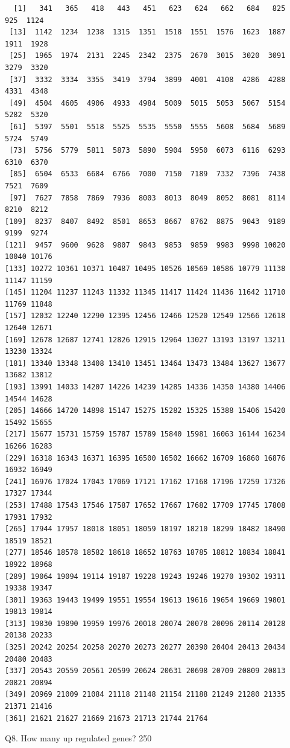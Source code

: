 \documentclass[
  letterpaper,
  DIV=11,
  numbers=noendperiod]{scrartcl}
\begin{document}
\begin{verbatim}
  [1]   341   365   418   443   451   623   624   662   684   825   925  1124
 [13]  1142  1234  1238  1315  1351  1518  1551  1576  1623  1887  1911  1928
 [25]  1965  1974  2131  2245  2342  2375  2670  3015  3020  3091  3279  3320
 [37]  3332  3334  3355  3419  3794  3899  4001  4108  4286  4288  4331  4348
 [49]  4504  4605  4906  4933  4984  5009  5015  5053  5067  5154  5282  5320
 [61]  5397  5501  5518  5525  5535  5550  5555  5608  5684  5689  5724  5749
 [73]  5756  5779  5811  5873  5890  5904  5950  6073  6116  6293  6310  6370
 [85]  6504  6533  6684  6766  7000  7150  7189  7332  7396  7438  7521  7609
 [97]  7627  7858  7869  7936  8003  8013  8049  8052  8081  8114  8210  8212
[109]  8237  8407  8492  8501  8653  8667  8762  8875  9043  9189  9199  9274
[121]  9457  9600  9628  9807  9843  9853  9859  9983  9998 10020 10040 10176
[133] 10272 10361 10371 10487 10495 10526 10569 10586 10779 11138 11147 11159
[145] 11204 11237 11243 11332 11345 11417 11424 11436 11642 11710 11769 11848
[157] 12032 12240 12290 12395 12456 12466 12520 12549 12566 12618 12640 12671
[169] 12678 12687 12741 12826 12915 12964 13027 13193 13197 13211 13230 13324
[181] 13340 13348 13408 13410 13451 13464 13473 13484 13627 13677 13682 13812
[193] 13991 14033 14207 14226 14239 14285 14336 14350 14380 14406 14544 14628
[205] 14666 14720 14898 15147 15275 15282 15325 15388 15406 15420 15492 15655
[217] 15677 15731 15759 15787 15789 15840 15981 16063 16144 16234 16266 16283
[229] 16318 16343 16371 16395 16500 16502 16662 16709 16860 16876 16932 16949
[241] 16976 17024 17043 17069 17121 17162 17168 17196 17259 17326 17327 17344
[253] 17488 17543 17546 17587 17652 17667 17682 17709 17745 17808 17931 17932
[265] 17944 17957 18018 18051 18059 18197 18210 18299 18482 18490 18519 18521
[277] 18546 18578 18582 18618 18652 18763 18785 18812 18834 18841 18922 18968
[289] 19064 19094 19114 19187 19228 19243 19246 19270 19302 19311 19338 19347
[301] 19363 19443 19499 19551 19554 19613 19616 19654 19669 19801 19813 19814
[313] 19830 19890 19959 19976 20018 20074 20078 20096 20114 20128 20138 20233
[325] 20242 20254 20258 20270 20273 20277 20390 20404 20413 20434 20480 20483
[337] 20543 20559 20561 20599 20624 20631 20698 20709 20809 20813 20821 20894
[349] 20969 21009 21084 21118 21148 21154 21188 21249 21280 21335 21371 21416
[361] 21621 21627 21669 21673 21713 21744 21764
\end{verbatim}

Q8. How many up regulated genes? 250
\end{document}
